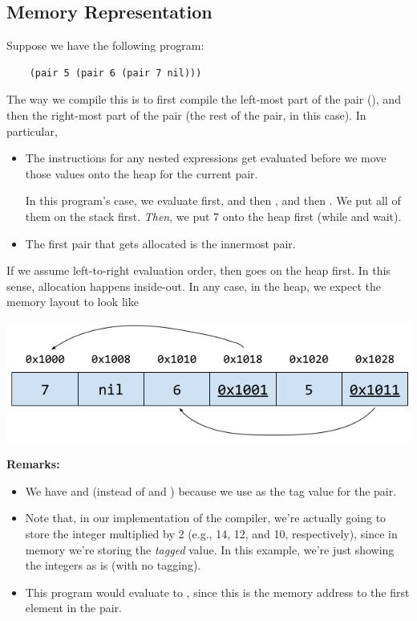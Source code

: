 \subsection{Memory Representation}
Suppose we have the following program: 
\begin{verbatim}
    (pair 5 (pair 6 (pair 7 nil)))\end{verbatim}
The way we compile this is to first compile the left-most part of the pair (), and then the right-most part of the pair (the rest of the pair, in this case). In particular,
\begin{itemize}
    \item The instructions for any nested expressions get evaluated before we move those values onto the heap for the current pair.
    \begin{mdframed}
        In this program's case, we evaluate  first, and then , and then . We put all of them on the stack first. \emph{Then}, we put 7 onto the heap first (while  and  wait). 
    \end{mdframed}
    
    \item The first pair that gets allocated is the innermost pair. 
\end{itemize}
If we assume left-to-right evaluation order, then  goes on the heap first. In this sense, allocation happens inside-out. In any case, in the heap, we expect the memory layout to look like
\begin{center}
    \includegraphics[scale=0.67]{assets/pair_heap.png}
\end{center}
\textbf{Remarks:} 
\begin{itemize}
    \item We have  and  (instead of  and ) because we use  as the tag value for the pair.
    \item Note that, in our implementation of the compiler, we're actually going to store the integer multiplied by 2 (e.g., 14, 12, and 10, respectively), since in memory we're storing the \emph{tagged} value. In this example, we're just showing the integers as is (with no tagging).
    \item This program would evaluate to , since this is the memory address to the first element in the pair. 
\end{itemize}

